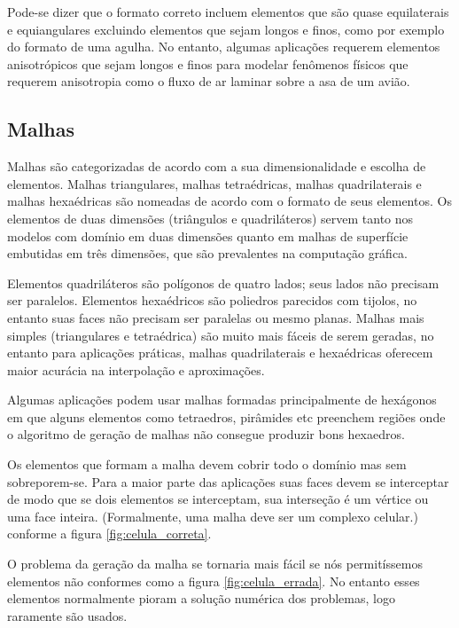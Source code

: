 Pode-se dizer que o formato correto incluem elementos que são quase equilaterais e equiangulares excluindo elementos que sejam longos e finos, como por exemplo do formato de uma agulha. No entanto, algumas aplicações requerem elementos anisotrópicos que sejam longos e finos para modelar fenômenos físicos que requerem anisotropia como o fluxo de ar laminar sobre a asa de um avião.

\subsection{Malhas}
Malhas são categorizadas de acordo com a sua dimensionalidade e escolha de elementos. Malhas triangulares, malhas tetraédricas, malhas quadrilaterais e malhas hexaédricas são nomeadas de acordo com o formato de seus elementos. Os elementos de duas dimensões (triângulos e quadriláteros) servem tanto nos modelos com domínio em duas dimensões quanto em malhas de superfície embutidas em três dimensões, que são prevalentes na computação gráfica.

Elementos quadriláteros são polígonos de quatro lados; seus lados não precisam ser paralelos. Elementos hexaédricos são poliedros parecidos com tijolos, no entanto suas faces não precisam ser paralelas ou mesmo planas. Malhas mais simples (triangulares e tetraédrica) são muito mais fáceis de serem geradas, no entanto para aplicações práticas, malhas quadrilaterais e hexaédricas oferecem maior acurácia na interpolação e aproximações.

Algumas aplicações podem usar malhas formadas principalmente de hexágonos em que alguns elementos como tetraedros, pirâmides etc preenchem regiões onde o algoritmo de geração de malhas não consegue produzir bons hexaedros.

Os elementos que formam a malha devem cobrir todo o domínio mas sem sobreporem-se. Para a maior parte das aplicações suas faces devem se interceptar de modo que se dois elementos se interceptam, sua interseção é um vértice ou uma face inteira. (Formalmente, uma malha deve ser um complexo celular.) conforme a figura \ref{fig:celula_correta}.

O problema da geração da malha se tornaria mais fácil se nós permitíssemos elementos não conformes como a figura \ref{fig:celula_errada}. No entanto esses elementos normalmente pioram a solução numérica dos problemas, logo raramente são usados.

